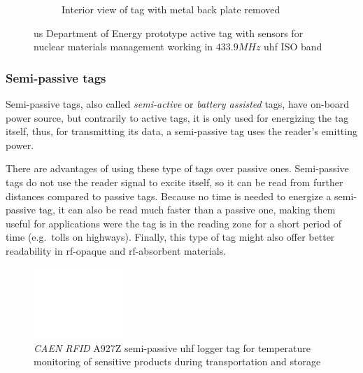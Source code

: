 \begin{figure}[!ht]
\begin{subfigure}{.4\textwidth}
        \caption{Interior view of tag with metal back plate removed}
        \label{fig:activetagsub2}
    \end{subfigure}
    \caption[\ac{us} Department of Energy prototype active tag with sensors for nuclear materials management working in $433.9MHz$ \ac{uhf} ISO band]{\ac{us} Department of Energy prototype active tag with sensors for nuclear materials management working in $433.9MHz$ \ac{uhf} ISO band~\cite{tsaiApplyingRFIDTechnology2008}} 
    \label{fig:activetag}
\end{figure}

\subsubsection{Semi-passive tags}

Semi-passive tags, also called \emph{semi-active} or \emph{battery assisted} tags, have on-board power source, but contrarily to active tags, it is only used for energizing the tag itself, thus, for transmitting its data, a semi-passive tag uses the reader's emitting power.

There are advantages of using these type of tags over passive ones.
Semi-passive tags do not use the reader signal to excite itself, so it can be read from further distances compared to passive tags. Because no time is needed to energize a semi-passive tag, it can also be read much faster than a passive one, making them useful for applications were the tag is in the reading zone for a short period of time (e.g.\ tolls on highways). Finally, this type of tag might also offer better readability in \ac{rf}-opaque and \ac{rf}-absorbent materials.

\begin{figure}[!ht]
    \centering
    \includegraphics[width=0.3\textwidth]{./figs/02-state-of-the-art/semiactive_tag.pdf}
    \caption[\textit{CAEN RFID} A927Z semi-passive \ac{uhf} logger tag for temperature monitoring of sensitive products during transportation and storage]{\textit{CAEN RFID} A927Z semi-passive \ac{uhf} logger tag for temperature monitoring of sensitive products during transportation and storage~\cite{caenCaenA927ZTemp}} 
    \label{fig:semipassivetag}
\end{figure}

